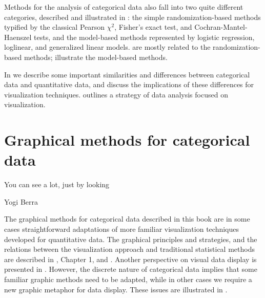 Methods for the analysis of categorical data also fall into two
quite different categories, described and illustrated in : the simple randomization-based
methods typified by
the classical Pearson $\chi^2$, Fisher's exact test, and Cochran-Mantel-Haenszel
tests, and the model-based methods represented by
logistic regression, loglinear, and generalized linear models.
are mostly related to the randomization-based methods; 
illustrate the model-based methods.

In  we describe some important similarities
and 
differences between categorical data and
quantitative data, and discuss the implications of these differences for
visualization techniques.
 outlines a strategy of data analysis
focused on visualization.




\section{Graphical methods for categorical data}\label{sec:intro-grmeth}
\epigraph{You can see a lot, just by looking}{Yogi Berra}

The graphical methods for categorical data described in this book
are in some cases straightforward adaptations of more familiar
visualization techniques developed for quantitative data.
The graphical principles and strategies, and the relations between
the visualization approach and traditional statistical methods
are described in \SSSG, Chapter 1, and \cite{Cleveland:VisData}.
Another perspective on visual data display is presented in .
However, the discrete nature of categorical data implies that
some familiar graphic methods need to be adapted, while in other
cases we require a new graphic metaphor for data display.
These issues are illustrated in .




